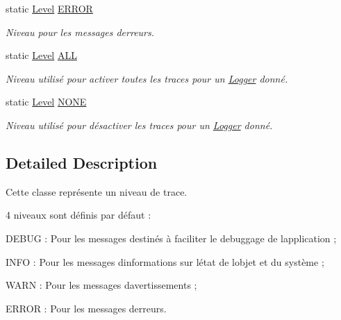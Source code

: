 \begin{DoxyCompactItemize}
static \hyperlink{classlogs_1_1Level}{Level} \hyperlink{classlogs_1_1Level_a2ab4cb2da672f44e6cb5ac1de987f8dc}{E\+R\+R\+OR}
\begin{DoxyCompactList}\small\item\em Niveau pour les messages d\textquotesingle{}erreurs. \end{DoxyCompactList}\item 
\mbox{\label{classlogs_1_1Level_adf67967616f2c99c2e53866598a8b058}} 
static \hyperlink{classlogs_1_1Level}{Level} \hyperlink{classlogs_1_1Level_adf67967616f2c99c2e53866598a8b058}{A\+LL}
\begin{DoxyCompactList}\small\item\em Niveau utilisé pour activer toutes les traces pour un \hyperlink{classlogs_1_1Logger}{Logger} donné. \end{DoxyCompactList}\item 
\mbox{\label{classlogs_1_1Level_ae9043efe20e05475fc39612ebd940074}} 
static \hyperlink{classlogs_1_1Level}{Level} \hyperlink{classlogs_1_1Level_ae9043efe20e05475fc39612ebd940074}{N\+O\+NE}
\begin{DoxyCompactList}\small\item\em Niveau utilisé pour désactiver les traces pour un \hyperlink{classlogs_1_1Logger}{Logger} donné. \end{DoxyCompactList}\end{DoxyCompactItemize}


\subsection{Detailed Description}
Cette classe représente un niveau de trace. 

4 niveaux sont définis par défaut \+:
\begin{DoxyItemize}
\item D\+E\+B\+UG \+: Pour les messages destinés à faciliter le debuggage de l\textquotesingle{}application ;
\item I\+N\+FO \+: Pour les messages d\textquotesingle{}informations sur l\textquotesingle{}état de l\textquotesingle{}objet et du système ;
\item W\+A\+RN \+: Pour les messages d\textquotesingle{}avertissements ;
\item E\+R\+R\+OR \+: Pour les messages d\textquotesingle{}erreurs. 
\end{DoxyItemize}

